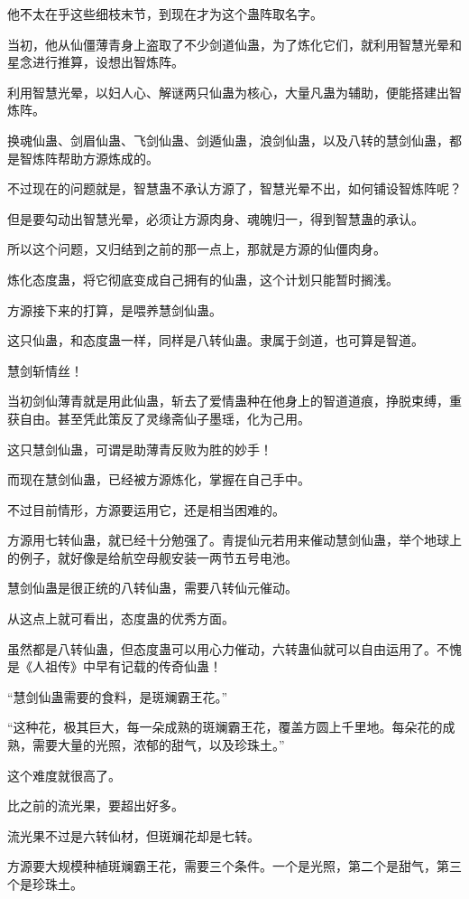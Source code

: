 \begin{this_body}
他不太在乎这些细枝末节，到现在才为这个蛊阵取名字。

当初，他从仙僵薄青身上盗取了不少剑道仙蛊，为了炼化它们，就利用智慧光晕和星念进行推算，设想出智炼阵。

利用智慧光晕，以妇人心、解谜两只仙蛊为核心，大量凡蛊为辅助，便能搭建出智炼阵。

换魂仙蛊、剑眉仙蛊、飞剑仙蛊、剑遁仙蛊，浪剑仙蛊，以及八转的慧剑仙蛊，都是智炼阵帮助方源炼成的。

不过现在的问题就是，智慧蛊不承认方源了，智慧光晕不出，如何铺设智炼阵呢？

但是要勾动出智慧光晕，必须让方源肉身、魂魄归一，得到智慧蛊的承认。

所以这个问题，又归结到之前的那一点上，那就是方源的仙僵肉身。

炼化态度蛊，将它彻底变成自己拥有的仙蛊，这个计划只能暂时搁浅。

方源接下来的打算，是喂养慧剑仙蛊。

这只仙蛊，和态度蛊一样，同样是八转仙蛊。隶属于剑道，也可算是智道。

慧剑斩情丝！

当初剑仙薄青就是用此仙蛊，斩去了爱情蛊种在他身上的智道道痕，挣脱束缚，重获自由。甚至凭此策反了灵缘斋仙子墨瑶，化为己用。

这只慧剑仙蛊，可谓是助薄青反败为胜的妙手！

而现在慧剑仙蛊，已经被方源炼化，掌握在自己手中。

不过目前情形，方源要运用它，还是相当困难的。

方源用七转仙蛊，就已经十分勉强了。青提仙元若用来催动慧剑仙蛊，举个地球上的例子，就好像是给航空母舰安装一两节五号电池。

慧剑仙蛊是很正统的八转仙蛊，需要八转仙元催动。

从这点上就可看出，态度蛊的优秀方面。

虽然都是八转仙蛊，但态度蛊可以用心力催动，六转蛊仙就可以自由运用了。不愧是《人祖传》中早有记载的传奇仙蛊！

“慧剑仙蛊需要的食料，是斑斓霸王花。”

“这种花，极其巨大，每一朵成熟的斑斓霸王花，覆盖方圆上千里地。每朵花的成熟，需要大量的光照，浓郁的甜气，以及珍珠土。”

这个难度就很高了。

比之前的流光果，要超出好多。

流光果不过是六转仙材，但斑斓花却是七转。

方源要大规模种植斑斓霸王花，需要三个条件。一个是光照，第二个是甜气，第三个是珍珠土。


\end{this_body}
